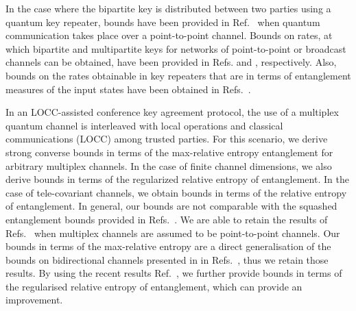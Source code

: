 \documentclass[aps,pra,twocolumn,superscriptaddress,longbibliography]{revtex4-1}
\begin{document}
In the case where the bipartite key is distributed between two parties using a quantum key repeater, bounds have been provided in Ref.~\cite{CM17} when quantum communication takes place over a point-to-point channel. %
Bounds on rates, at which bipartite and multipartite keys for networks of point-to-point or broadcast channels can be obtained, have been provided in Refs. \cite{pirandola2019capacities,AML16,azuma2017aggregating,RKB+17,bauml2018linear} and \cite{bauml2017fundamental}, respectively. Also, bounds on the rates obtainable in key repeaters that are in terms of entanglement measures of the input states have been obtained in Refs.~\cite{bauml2015limitations,christandl2017private}.

In an LOCC-assisted conference key agreement protocol, the use of a multiplex quantum channel is interleaved with local operations and classical communications (LOCC) among trusted parties. For this scenario, we derive strong converse bounds in terms of the max-relative entropy entanglement for arbitrary multiplex channels. In the case of finite channel dimensions, we also derive bounds in terms of the regularized relative entropy of entanglement. In the case of tele-covariant channels, we obtain bounds in terms of the relative entropy of entanglement. In general, our bounds are not comparable with the squashed entanglement bounds provided in Refs.~\cite{TGW14,seshadreesan2016bounds}. We are able to retain the results of Refs.~\cite{PLOB15,WTB16,CM17,FF19} when multiplex channels are assumed to be point-to-point channels. Our bounds in terms of the max-relative entropy are a direct generalisation of the bounds on bidirectional channels presented in in Refs.~\cite{DBW17,BDW18,D18thesis}, thus we retain those results. By using the recent results Ref.~\cite{FF19}, we further provide bounds in terms of the regularised relative entropy of entanglement, which can provide an improvement.
\end{document}
